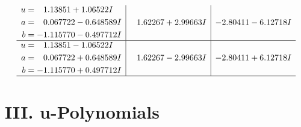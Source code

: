 \documentclass[1p]{elsarticle_modified}
\theoremstyle{definition}
\begin{document}
$$\begin{array}{c|c|c}
\begin{aligned}
u &= \phantom{-}1.13851 + 1.06522 I \\
a &= \phantom{-}0.067722 - 0.648589 I \\
b &= -1.115770 - 0.497712 I\end{aligned}
 & \phantom{-}1.62267 + 2.99663 I & -2.80411 - 6.12718 I \\ \hline\begin{aligned}
u &= \phantom{-}1.13851 - 1.06522 I \\
a &= \phantom{-}0.067722 + 0.648589 I \\
b &= -1.115770 + 0.497712 I\end{aligned}
 & \phantom{-}1.62267 - 2.99663 I & -2.80411 + 6.12718 I\\
 \hline 
 \end{array}$$\newpage
\newpage\renewcommand{\arraystretch}{1}
\centering \section*{ III. u-Polynomials}
\end{document}
